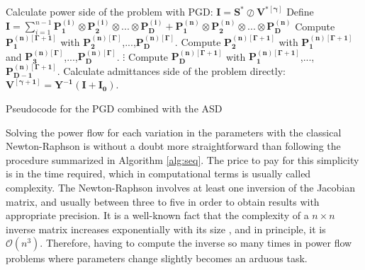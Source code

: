 \begin{algorithm}[H]
\begin{algorithmic}[1]
\STATE Calculate power side of the problem with PGD: $\bm{I}=\bm{S^*} \oslash \bm{V^{*[\gamma]}}$
\STATE Define $\bm{I}=\sum_{i=1}^{n-1} \bm{P^{(i)}_1} \otimes \bm{P^{(i)}_2} \otimes ... \otimes \bm{P^{(i)}_{D}} +  \bm{P^{(n)}_1} \otimes \bm{P^{(n)}_2} \otimes ... \otimes \bm{P^{(n)}_{D}} $
\STATE Compute $\bm{P_1^{(n)[\Gamma+1]}}$ with $\bm{P_2^{(n)[\Gamma]}}$,...,$\bm{P_{D}^{(n)[\Gamma]}}$.   
\STATE Compute $\bm{P_2^{(n)[\Gamma+1]}}$ with $\bm{P_1^{(n)[\Gamma+1]}}$ and $\bm{P_3^{(n)[\Gamma]}}$,...,$\bm{P_{D}^{(n)[\Gamma]}}$.   
\STATE $\vdots$
\STATE Compute $\bm{P_D^{(n)[\Gamma+1]}}$ with $\bm{P_1^{(n)[\Gamma+1]}}$,...,$\bm{P_{D-1}^{(n)[\Gamma+1]}}$.   
\ENDFOR
\ENDFOR
\STATE Calculate admittances side of the problem directly: $\bm{V^{[\gamma+1]}}=\bm{Y^{-1}}(\bm{I}+\bm{I_0})$.
\ENDFOR
\end{algorithmic}
\caption{Pseudocode for the PGD combined with the ASD}
\label{alg:seq}
\end{algorithm}
Solving the power flow for each variation in the parameters with the classical Newton-Raphson is without a doubt more straightforward than following the procedure summarized in Algorithm \ref{alg:seq}. %
 The price to pay for this simplicity is in the time required, which in computational terms is usually called complexity. The Newton-Raphson involves at least one inversion of the Jacobian matrix, and usually between three to five in order to obtain results with appropriate precision. It is a well-known fact that the complexity of a $n \times n$ inverse matrix increases exponentially with its size \cite{he2009research}, and in principle, it is $\mathcal{O}(n^3)$. Therefore, having to compute the inverse so many times in power flow problems where parameters change slightly becomes an arduous task. 


